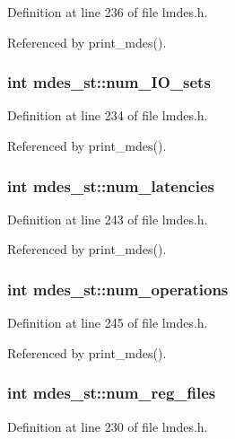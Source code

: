 Definition at line 236 of file lmdes.h.

Referenced by print\_\-mdes().
\subsubsection{\setlength{\rightskip}{0pt plus 5cm}int \bf{mdes\_\-st::num\_\-IO\_\-sets}}\label{structmdes__st_3b3f4986cd5a5e1c15bc56448a05ed60}




Definition at line 234 of file lmdes.h.

Referenced by print\_\-mdes().
\subsubsection{\setlength{\rightskip}{0pt plus 5cm}int \bf{mdes\_\-st::num\_\-latencies}}\label{structmdes__st_aa337a8afe70c1f724e176bb015c9c28}




Definition at line 243 of file lmdes.h.

Referenced by print\_\-mdes().
\subsubsection{\setlength{\rightskip}{0pt plus 5cm}int \bf{mdes\_\-st::num\_\-operations}}\label{structmdes__st_0c7d66330250070b9a723afcae436545}




Definition at line 245 of file lmdes.h.

Referenced by print\_\-mdes().
\subsubsection{\setlength{\rightskip}{0pt plus 5cm}int \bf{mdes\_\-st::num\_\-reg\_\-files}}\label{structmdes__st_95981384eaa25ca98f34024f6b5205f2}




Definition at line 230 of file lmdes.h.
